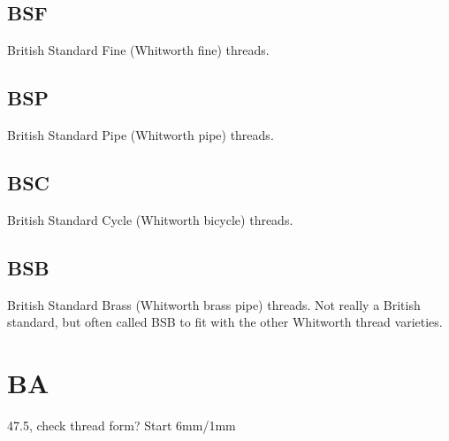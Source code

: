 \subsection{BSF}
British Standard Fine (Whitworth fine) threads.
\clearpage

\subsection{BSP}
British Standard Pipe (Whitworth pipe) threads.
\clearpage

\subsection{BSC}
British Standard Cycle (Whitworth bicycle) threads.
\clearpage

\subsection{BSB}
British Standard Brass (Whitworth brass pipe) threads.  Not really a British standard, but often called BSB to fit with the other Whitworth thread varieties.
\clearpage

\clearpage
\section{BA}
47.5\degree, check thread form?
Start 
6mm/1mm
\\ \\ \\ \\ \\ \\ \\ \\ \\ \\ \\ \\ \\ \\ \\ \\ \\ \\               



\clearpage
